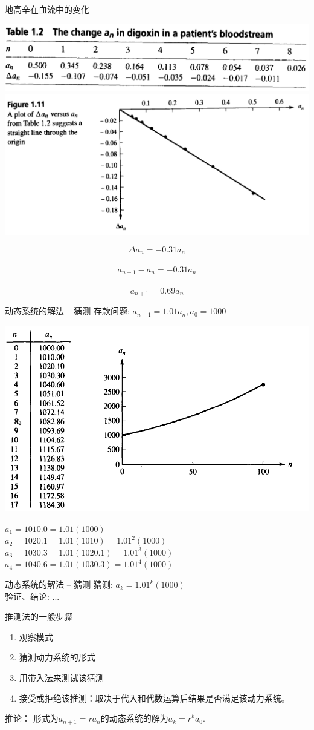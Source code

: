\documentclass{beamer}
\begin{document}
\begin{frame}{地高辛在血流中的变化}
  \begin{center}
    \includegraphics[width=.8\textwidth{}]{digoxin-table.png}\\
    \includegraphics[width=.6\textwidth{}]{digoxin-fig.png}
  \end{center}
\[
\Delta a_n = -0.31a_n
\]\\[-25pt]
\[
a_{n+1} -  a_n = -0.31a_n
\]\\[-25pt]
\[
a_{n+1} = 0.69a_n
\]
\end{frame}

\begin{frame}{动态系统的解法 -- 猜测}
  存款问题: $a_{n+1} = 1.01a_n, a_0 = 1000$
  \begin{center}
    \includegraphics[width=.4\textwidth{}]{saving.png}
  \end{center}

$a_1 = 1010.0 = 1.01(1000)$\\
$a_2 = 1020.1 = 1.01(1010) = 1.01^2 (1000)$\\
$a_3 = 1030.3 = 1.01(1020.1) = 1.01^3 (1000)$\\
$a_4 = 1040.6 = 1.01(1030.3) = 1.01^4 (1000)$
\end{frame}

\begin{frame}{动态系统的解法 -- 猜测}
猜测: $a_k = 1.01^k(1000)$\\
验证、结论: ...

\begin{block}{推测法的一般步骤}
\begin{enumerate}
\item 观察模式
\item 猜测动力系统的形式
\item 用带入法来测试该猜测
\item 接受或拒绝该推测：取决于代入和代数运算后结果是否满足该动力系统。
\end{enumerate}
\end{block}

推论： 形式为$a_{n+1} = ra_n$的动态系统的解为$a_k = r^k a_0$.

\end{frame}
\end{document}
